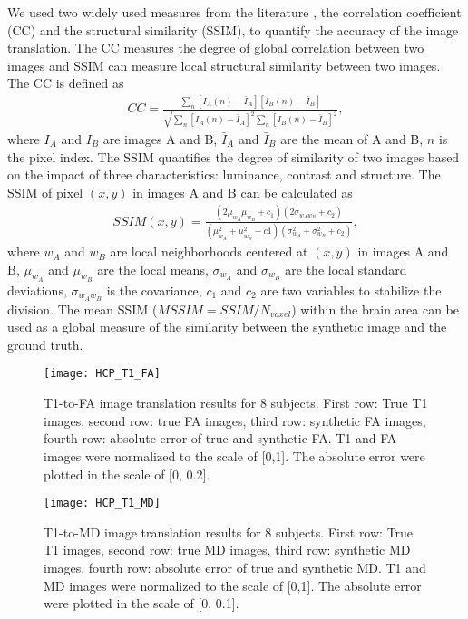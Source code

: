 \documentclass{article}
\begin{document}
We used two widely used measures from the literature \cite{wolterink2017deep,emami2018generating}, the correlation coefficient (CC) and the structural similarity (SSIM), to quantify the accuracy of the image translation. The CC measures the degree of global correlation between two images and SSIM can measure local structural similarity between two images.
The CC is defined as \cite{lee1988thirteen}
\begin{align}
  CC=\frac{\sum_{n}^{}\left [I_A(n)-\bar{I}_A\right ]\left [I_B(n)-\bar{I}_B\right ]}{\sqrt{\sum_{n}^{}\left [I_A(n)-\bar{I}_A\right ]^2 \sum_{n}^{}\left [I_B(n)-\bar{I}_B\right ]^2}},
\end{align}
where $I_A$ and $I_B$ are images A and B, $\bar{I}_A$ and $\bar{I}_B$ are the mean of A and B, $n$ is the pixel index.
The SSIM quantifies the degree of similarity of two images based on the impact of three characteristics: luminance, contrast and structure. The SSIM of pixel $(x,y)$ in images A and B can be calculated as \cite{wang2004image}
\begin{align}
  SSIM(x,y) = \frac{(2 \mu_{w_A} \mu_{w_B} +c_1)(2 \sigma_{w_Aw_B}+c_2)}{(\mu_{w_A}^2+\mu_{w_B}^2+c1)(\sigma_{w_A}^2+\sigma_{w_B}^2+c_2)},
\end{align}
where $w_A$ and $w_B$ are local neighborhoods centered at $(x,y)$ in images A and B, $\mu_{w_A}$ and $\mu_{w_B}$ are the local means, $\sigma_{w_A}$ and $\sigma_{w_B}$ are the local standard deviations, $\sigma_{w_Aw_B}$ is the covariance, $c_1$ and $c_2$ are two variables to stabilize the division. The mean SSIM ($MSSIM=SSIM/N_{voxel}$) within the brain area can be used as a global measure of the similarity between the synthetic image and the ground truth.

\begin{figure*}
\begin{minipage}[b]{1.0\linewidth}
  \centering
  \centerline{\texttt{[image: HCP\_T1\_FA]}}
\end{minipage}
\caption{T1-to-FA image translation results for 8 subjects. First row: True T1 images, second row: true FA images, third row: synthetic FA images, fourth row: absolute error of true and synthetic FA. T1 and FA images were normalized to the scale of [0,1]. The absolute error were plotted in the scale of [0, 0.2].}
\label{figure1}
\end{figure*}

\begin{figure*}
\begin{minipage}[b]{1.0\linewidth}
  \centering
  \centerline{\texttt{[image: HCP\_T1\_MD]}}
\end{minipage}
\caption{T1-to-MD image translation results for 8 subjects. First row: True T1 images, second row: true MD images, third row: synthetic MD images, fourth row: absolute error of true and synthetic MD. T1 and MD images were normalized to the scale of [0,1]. The absolute error were plotted in the scale of [0, 0.1].}
\label{figure2}
\end{figure*}
\end{document}
